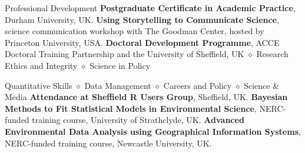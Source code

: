 \begin{rubric}{Professional Development}
\entry*[2022-present] \textbf{Postgraduate Certificate in Academic Practice}, Durham University, UK.
\entry*[2020] \textbf{Using Storytelling to Communicate Science}, science communication workshop with The Goodman Center, hosted by Princeton University, USA.
\entry*[2014 -- 2018] \textbf{Doctoral Development
Programme}, ACCE Doctoral Training Partnership and the University of Sheffield, UK $\diamond$ Research Ethics and Integrity $\diamond$ Science in Policy \par Quantitative Skills $\diamond$ Data Management $\diamond$ Careers and Policy $\diamond$ Science \& Media
\entry*[2014 -- 2018] \textbf{Attendance at Sheffield R Users Group}, Sheffield, UK.
\entry*[2016] \textbf{Bayesian Methods to Fit Statistical Models in
Environmental Science}, NERC-funded training course, University of Strathclyde, UK.
\entry*[2015] \textbf{Advanced Environmental Data Analysis using
Geographical Information Systems}, NERC-funded training course, Newcastle University, UK.

\end{rubric}
